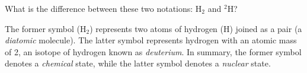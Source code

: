 

What is the difference between these two notations: H$_{2}$ and $^{2}$H?







The former symbol (H$_{2}$) represents two atoms of hydrogen (H) joined as a pair (a {\it diatomic} molecule).  The latter symbol represents hydrogen with an atomic mass of 2, an isotope of hydrogen known as {\it deuterium}.  In summary, the former symbol denotes a {\it chemical} state, while the latter symbol denotes a {\it nuclear} state.











